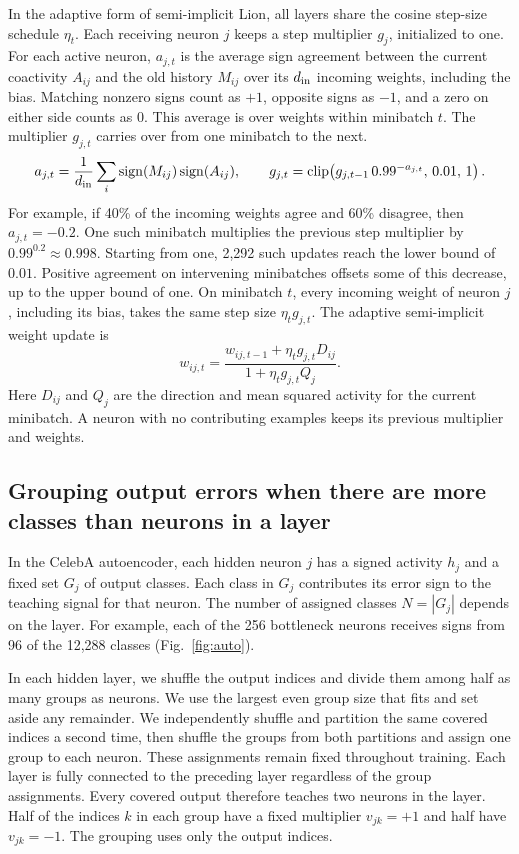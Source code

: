 \documentclass[10pt]{article}
\DeclareMathOperator{\sgn}{sign}
\begin{document}
In the adaptive form of semi-implicit Lion, all layers share the cosine step-size schedule $\eta_t$. Each receiving neuron $j$ keeps a step multiplier $g_j$, initialized to one. For each active neuron, $a_{j,t}$ is the average sign agreement between the current coactivity $A_{ij}$ and the old history $M_{ij}$ over its $d_{\rm in}$ incoming weights, including the bias. Matching nonzero signs count as $+1$, opposite signs as $-1$, and a zero on either side counts as $0$. This average is over weights within minibatch $t$. The multiplier $g_{j,t}$ carries over from one minibatch to the next.
\begin{equation}
 a_{j,t}=\frac{1}{d_{\rm in}}\sum_i\sgn(M_{ij})\sgn(A_{ij}),
 \qquad g_{j,t}=\operatorname{clip}\!\left(g_{j,t-1}\,0.99^{-a_{j,t}},\,0.01,\,1\right).
 \label{eq:agreement}
\end{equation}
For example, if 40\% of the incoming weights agree and 60\% disagree, then $a_{j,t}=-0.2$. One such minibatch multiplies the previous step multiplier by $0.99^{0.2}\approx0.998$. Starting from one, 2,292 such updates reach the lower bound of $0.01$. Positive agreement on intervening minibatches offsets some of this decrease, up to the upper bound of one. On minibatch $t$, every incoming weight of neuron $j$, including its bias, takes the same step size $\eta_t g_{j,t}$. The adaptive semi-implicit weight update is
\begin{equation}
 w_{ij,t}=\frac{w_{ij,t-1}+\eta_t g_{j,t} D_{ij}}{1+\eta_t g_{j,t} Q_j}.
 \label{eq:adaptive-update}
\end{equation}
Here $D_{ij}$ and $Q_j$ are the direction and mean squared activity for the current minibatch. A neuron with no contributing examples keeps its previous multiplier and weights.

\subsection{Grouping output errors when there are more classes than neurons in a layer}
\label{sec:grouped-signs}
In the CelebA autoencoder, each hidden neuron $j$ has a signed activity $h_j$ and a fixed set $G_j$ of output classes. Each class in $G_j$ contributes its error sign to the teaching signal for that neuron. The number of assigned classes $N=|G_j|$ depends on the layer. For example, each of the 256 bottleneck neurons receives signs from 96 of the 12,288 classes (Fig.~\ref{fig:auto}).

In each hidden layer, we shuffle the output indices and divide them among half as many groups as neurons. We use the largest even group size that fits and set aside any remainder. We independently shuffle and partition the same covered indices a second time, then shuffle the groups from both partitions and assign one group to each neuron. These assignments remain fixed throughout training. Each layer is fully connected to the preceding layer regardless of the group assignments. Every covered output therefore teaches two neurons in the layer. Half of the indices $k$ in each group have a fixed multiplier $v_{jk}=+1$ and half have $v_{jk}=-1$. The grouping uses only the output indices.
\end{document}
